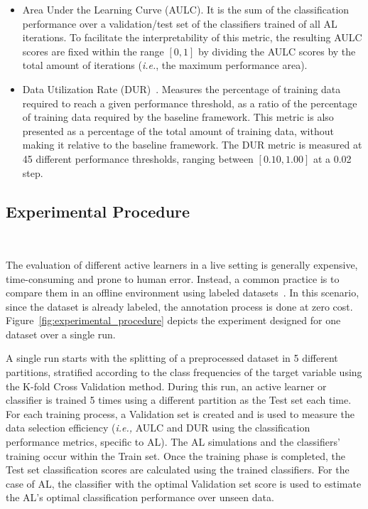 \documentclass[parskip=full]{scrartcl}
\begin{document}
\begin{itemize}

    \item Area Under the Learning Curve (AULC). It is the sum of the
        classification performance over a validation/test set of the
        classifiers trained of all AL iterations. To facilitate the
        interpretability of this metric, the resulting AULC scores are fixed
        within the range $[0, 1]$ by dividing the AULC scores by the total
        amount of iterations (\textit{i.e.}, the maximum performance area).

    \item Data Utilization Rate (DUR)~\cite{Reitmaier2013}. Measures the
        percentage of training data required to reach a given performance
        threshold, as a ratio of the percentage of training data required by
        the baseline framework. This metric is also presented as a percentage
        of the total amount of training data, without making it relative to
        the baseline framework. The DUR metric is measured at 45 different
        performance thresholds, ranging between $[0.10, 1.00]$ at a 0.02 step.

\end{itemize}

\subsection{Experimental Procedure}~\label{sec:experimental_procedure}

The evaluation of different active learners in a live setting is generally
expensive, time-consuming and prone to human error. Instead, a common practice
is to compare them in an offline environment using labeled
datasets~\cite{Kagy2019}. In this scenario, since the dataset is already
labeled, the annotation process is done at zero cost.
Figure~\ref{fig:experimental_procedure} depicts the experiment designed for
one dataset over a single run. 

A single run starts with the splitting of a preprocessed dataset in 5
different partitions, stratified according to the class frequencies of the
target variable using the K-fold Cross Validation method. During this run, an
active learner or classifier is trained 5 times using a different partition as
the Test set each time. For each training process, a Validation set is created
and is used to measure the data selection efficiency (\textit{i.e.,} AULC and
DUR using the classification performance metrics, specific to AL). The AL
simulations and the classifiers' training occur within the Train set. Once the
training phase is completed, the Test set classification scores are calculated
using the trained classifiers. For the case of AL, the classifier with the
optimal Validation set score is used to estimate the AL's optimal
classification performance over unseen data.
\end{document}
